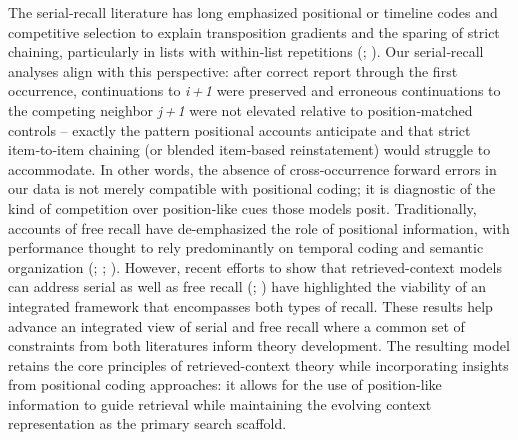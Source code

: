 \documentclass[
  man,
  floatsintext,
  longtable,
  nolmodern,
  notxfonts,
  notimes,
  draftfirst,
  colorlinks=true,linkcolor=blue,citecolor=blue,urlcolor=blue]{apa7}
\begin{document}
The serial‑recall literature has long emphasized positional or timeline
codes and competitive selection to explain transposition gradients and
the sparing of strict chaining, particularly in lists with within‑list
repetitions (;
). Our serial‑recall
analyses align with this perspective: after correct report through the
first occurrence, continuations to \emph{i\,+\,1} were preserved and
erroneous continuations to the competing neighbor \emph{j\,+\,1} were
not elevated relative to position‑matched controls -- exactly the
pattern positional accounts anticipate and that strict item‑to‑item
chaining (or blended item‑based reinstatement) would struggle to
accommodate. In other words, the absence of cross‑occurrence forward
errors in our data is not merely compatible with positional coding; it
is diagnostic of the kind of competition over position‑like cues those
models posit. Traditionally, accounts of free recall have de-emphasized
the role of positional information, with performance thought to rely
predominantly on temporal coding and semantic organization
(;
;
). However,
recent efforts to show that retrieved-context models can address serial
as well as free recall (;
) have highlighted the
viability of an integrated framework that encompasses both types of
recall. These results help advance an integrated view of serial and free
recall where a common set of constraints from both literatures inform
theory development. The resulting model retains the core principles of
retrieved-context theory while incorporating insights from positional
coding approaches: it allows for the use of position-like information to
guide retrieval while maintaining the evolving context representation as
the primary search scaffold.
\end{document}
